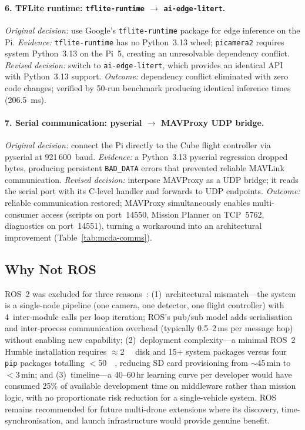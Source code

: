 \paragraph{6. TFLite runtime: \texttt{tflite-runtime} $\rightarrow$ \texttt{ai-edge-litert}.}
\emph{Original decision:} use Google's \texttt{tflite-runtime} package for edge inference on the Pi.
\emph{Evidence:} \texttt{tflite-runtime} has no Python~3.13 wheel; \texttt{picamera2} requires system Python~3.13 on the Pi~5, creating an unresolvable dependency conflict.
\emph{Revised decision:} switch to \texttt{ai-edge-litert}, which provides an identical API with Python~3.13 support.
\emph{Outcome:} dependency conflict eliminated with zero code changes; verified by 50-run benchmark producing identical inference times (\SI{206.5}{\milli\second}).

\paragraph{7. Serial communication: pyserial $\rightarrow$ MAVProxy UDP bridge.}
\emph{Original decision:} connect the Pi directly to the Cube flight controller via pyserial at 921\,600~baud.
\emph{Evidence:} a Python~3.13 pyserial regression dropped bytes, producing persistent \texttt{BAD\_DATA} errors that prevented reliable MAVLink communication.
\emph{Revised decision:} interpose MAVProxy as a UDP bridge; it reads the serial port with its C-level handler and forwards to UDP endpoints.
\emph{Outcome:} reliable communication restored; MAVProxy simultaneously enables multi-consumer access (scripts on port~14550, Mission Planner on TCP~5762, diagnostics on port~14551), turning a workaround into an architectural improvement (Table~\ref{tab:mcda-comms}).

\subsection{Why Not ROS}\label{sec:ros-rationale}

ROS~2 was excluded for three reasons~\cite{quigley2009ros}: (1)~architectural mismatch---the system is a single-node pipeline (one camera, one detector, one flight controller) with 4~inter-module calls per loop iteration; ROS's pub/sub model adds serialisation and inter-process communication overhead (typically 0.5--2\,ms per message hop) without enabling new capability; (2)~deployment complexity---a minimal ROS~2 Humble installation requires ${\approx}$\SI{2}{\giga\byte} disk and 15+ system packages versus four \texttt{pip} packages totalling $<$\SI{50}{\mega\byte}, reducing SD card provisioning from ${\sim}$45\,min to $<$3\,min; and (3)~timeline---a 40--60\,hr learning curve per developer would have consumed 25\% of available development time on middleware rather than mission logic, with no proportionate risk reduction for a single-vehicle system. ROS remains recommended for future multi-drone extensions where its discovery, time-synchronisation, and launch infrastructure would provide genuine benefit.


